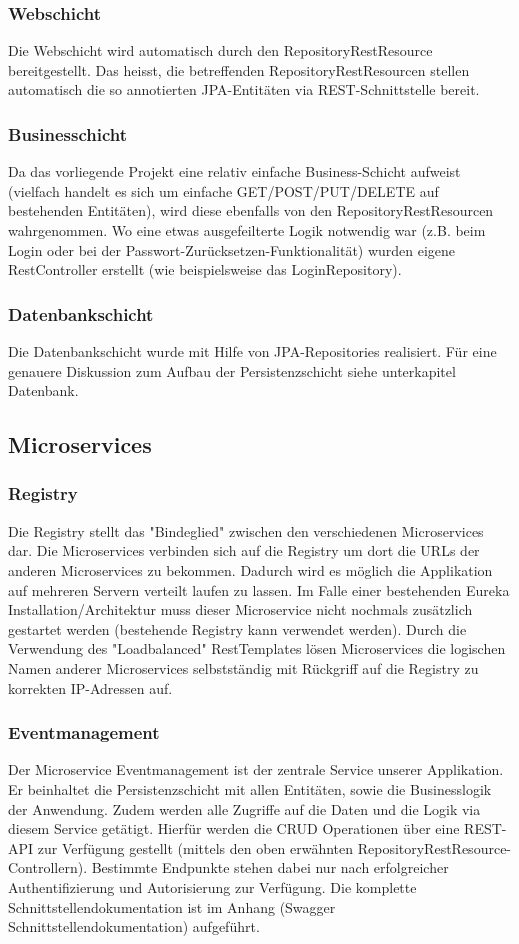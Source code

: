 \documentclass[11pt]{article} %
\begin{document}
\subsubsection{Webschicht}
Die Webschicht wird automatisch durch den RepositoryRestResource bereitgestellt. Das heisst, die betreffenden RepositoryRestResourcen stellen automatisch die so annotierten JPA-Entitäten via REST-Schnittstelle bereit.

\subsubsection{Businesschicht}
Da das vorliegende Projekt eine relativ einfache Business-Schicht aufweist (vielfach handelt es sich um einfache GET/POST/PUT/DELETE auf bestehenden Entitäten), wird diese ebenfalls von den RepositoryRestResourcen wahrgenommen.
Wo eine etwas ausgefeilterte Logik notwendig war (z.B. beim Login oder bei der Passwort-Zurücksetzen-Funktionalität) wurden eigene RestController erstellt (wie beispielsweise das LoginRepository).

\subsubsection{Datenbankschicht}
Die Datenbankschicht wurde mit Hilfe von JPA-Repositories realisiert. Für eine genauere Diskussion zum Aufbau der Persistenzschicht siehe unterkapitel Datenbank.

\subsection{Microservices}
\subsubsection{Registry}
Die Registry stellt das "Bindeglied" zwischen den verschiedenen Microservices dar. Die Microservices verbinden sich auf die Registry um dort die URLs der anderen Microservices zu bekommen. Dadurch wird es möglich die Applikation auf mehreren Servern verteilt laufen zu lassen. Im Falle einer bestehenden Eureka Installation/Architektur muss dieser Microservice nicht nochmals zusätzlich gestartet werden (bestehende Registry kann verwendet werden).
Durch die Verwendung des "Loadbalanced" RestTemplates lösen Microservices die logischen Namen anderer Microservices selbstständig mit Rückgriff auf die Registry zu korrekten IP-Adressen auf.

\subsubsection{Eventmanagement}
Der Microservice Eventmanagement ist der zentrale Service unserer Applikation. Er beinhaltet die Persistenzschicht mit allen Entitäten, sowie die Businesslogik der Anwendung. Zudem werden alle Zugriffe auf die Daten und die Logik via diesem Service getätigt. Hierfür werden die CRUD Operationen über eine REST-API zur Verfügung gestellt (mittels den oben erwähnten RepositoryRestResource-Controllern). Bestimmte Endpunkte stehen dabei nur nach erfolgreicher Authentifizierung und Autorisierung zur Verfügung. Die komplette Schnittstellendokumentation ist im Anhang (Swagger Schnittstellendokumentation) aufgeführt.
\end{document}
